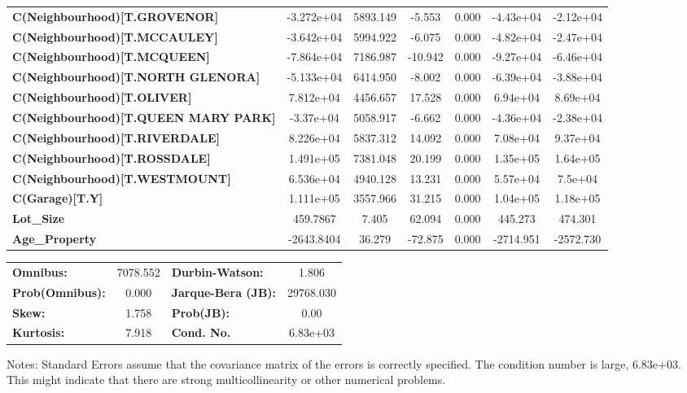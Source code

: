 \documentclass{report}
\begin{document}
\begin{center}
\begin{tabular}{lcccccc}
\textbf{C(Neighbourhood)[T.GROVENOR]}          &   -3.272e+04  &     5893.149     &    -5.553  &         0.000        &    -4.43e+04    &    -2.12e+04     \\
\textbf{C(Neighbourhood)[T.MCCAULEY]}          &   -3.642e+04  &     5994.922     &    -6.075  &         0.000        &    -4.82e+04    &    -2.47e+04     \\
\textbf{C(Neighbourhood)[T.MCQUEEN]}           &   -7.864e+04  &     7186.987     &   -10.942  &         0.000        &    -9.27e+04    &    -6.46e+04     \\
\textbf{C(Neighbourhood)[T.NORTH GLENORA]}     &   -5.133e+04  &     6414.950     &    -8.002  &         0.000        &    -6.39e+04    &    -3.88e+04     \\
\textbf{C(Neighbourhood)[T.OLIVER]}            &    7.812e+04  &     4456.657     &    17.528  &         0.000        &     6.94e+04    &     8.69e+04     \\
\textbf{C(Neighbourhood)[T.QUEEN MARY PARK]}   &    -3.37e+04  &     5058.917     &    -6.662  &         0.000        &    -4.36e+04    &    -2.38e+04     \\
\textbf{C(Neighbourhood)[T.RIVERDALE]}         &    8.226e+04  &     5837.312     &    14.092  &         0.000        &     7.08e+04    &     9.37e+04     \\
\textbf{C(Neighbourhood)[T.ROSSDALE]}          &    1.491e+05  &     7381.048     &    20.199  &         0.000        &     1.35e+05    &     1.64e+05     \\
\textbf{C(Neighbourhood)[T.WESTMOUNT]}         &    6.536e+04  &     4940.128     &    13.231  &         0.000        &     5.57e+04    &      7.5e+04     \\
\textbf{C(Garage)[T.Y]}                        &    1.111e+05  &     3557.966     &    31.215  &         0.000        &     1.04e+05    &     1.18e+05     \\
\textbf{Lot\_Size}                             &     459.7867  &        7.405     &    62.094  &         0.000        &      445.273    &      474.301     \\
\textbf{Age\_Property}                         &   -2643.8404  &       36.279     &   -72.875  &         0.000        &    -2714.951    &    -2572.730     \\
\bottomrule
\end{tabular}
\begin{tabular}{lclc}
\textbf{Omnibus:}       & 7078.552 & \textbf{  Durbin-Watson:     } &     1.806  \\
\textbf{Prob(Omnibus):} &   0.000  & \textbf{  Jarque-Bera (JB):  } & 29768.030  \\
\textbf{Skew:}          &   1.758  & \textbf{  Prob(JB):          } &      0.00  \\
\textbf{Kurtosis:}      &   7.918  & \textbf{  Cond. No.          } &  6.83e+03  \\
\bottomrule
\end{tabular}
\end{center}

Notes: \newline
 [1] Standard Errors assume that the covariance matrix of the errors is correctly specified. \newline
 [2] The condition number is large, 6.83e+03. This might indicate that there are \newline
 strong multicollinearity or other numerical problems.
\end{document}
